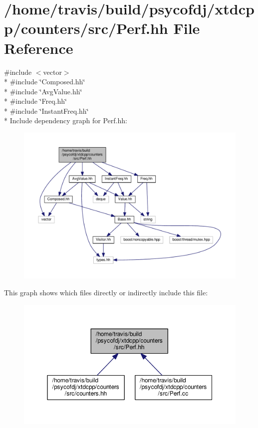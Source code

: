 \hypertarget{Perf_8hh}{\section{/home/travis/build/psycofdj/xtdcpp/counters/src/\-Perf.hh File Reference}
\label{Perf_8hh}
}
{\ttfamily \#include $<$vector$>$}\\*
{\ttfamily \#include \char`\"{}Composed.\-hh\char`\"{}}\\*
{\ttfamily \#include \char`\"{}Avg\-Value.\-hh\char`\"{}}\\*
{\ttfamily \#include \char`\"{}Freq.\-hh\char`\"{}}\\*
{\ttfamily \#include \char`\"{}Instant\-Freq.\-hh\char`\"{}}\\*
Include dependency graph for Perf.\-hh\-:
\nopagebreak
\begin{figure}[H]
\begin{center}
\leavevmode
\includegraphics[width=350pt]{Perf_8hh__incl}
\end{center}
\end{figure}
This graph shows which files directly or indirectly include this file\-:
\nopagebreak
\begin{figure}[H]
\begin{center}
\leavevmode
\includegraphics[width=350pt]{Perf_8hh__dep__incl}
\end{center}
\end{figure}
